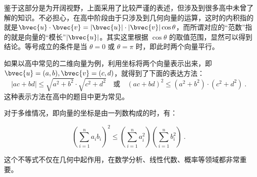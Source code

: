 鉴于这部分是为开阔视野，上面采用了比较严谨的表述，但涉及到很多高中未曾了解的知识。不必担心，在高中阶段由于只涉及到几何向量的运算，这时的内积指的就是$\bvec{u}\cdot\bvec{v}=|\bvec{u}|\cdot|\bvec{v}|\cos\theta$，而所谓对应的“范数”指的就是向量的“模长”$|\bvec{u}|$。其实这里根据 $\cos \theta$ 的取值范围，显然可以得到结论。等号成立的条件是当 $\theta = 0$ 或 $\theta = \pi$ 时，即此时两个向量平行。

如果以高中常见的二维向量为例，利用坐标将两个向量表示出来，即$\bvec{u}=(a,b),\bvec{v}=(c,d)$，就得到了下面的表达方法：
\begin{equation}
|ac+bd|\leq\sqrt {a^2 + b^2}\cdot\sqrt{c^2 + d^2}\quad\text{或} \quad(ac+bd)^2\leq(a^2 + b^2)\cdot(c^2 + d^2)~.
\end{equation}
这种表示方法在高中的题目中更为常见。

对于多维情况，即向量的坐标是由一列数构成的时，有：

\begin{equation}
\left( \sum_{i=1}^{n} a_i b_i \right)^2\leq\left( \sum_{i=1}^{n} a_i^2 \right) \left( \sum_{i=1}^{n} b_i^2 \right) ~.
\end{equation}

这个不等式不仅在几何中起作用，在数学分析、线性代数、概率等领域都非常重要。
